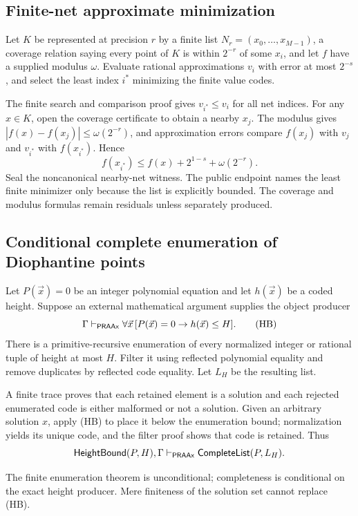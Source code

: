 \subsection{Finite-net approximate minimization}

Let \(K\) be represented at precision \(r\) by a finite list
\(N_r=(x_0,\ldots,x_{M-1})\), a coverage relation saying every point of \(K\)
is within \(2^{-r}\) of some \(x_i\), and let \(f\) have a supplied modulus
\(\omega\).  Evaluate rational approximations \(v_i\) with error at most
\(2^{-s}\), and select the least index \(i^*\) minimizing the finite value
codes.

The finite search and comparison proof gives
\(v_{i^*}\le v_i\) for all net indices.  For any \(x\in K\), open the coverage
certificate to obtain a nearby \(x_j\).  The modulus gives
\(|f(x)-f(x_j)|\le\omega(2^{-r})\), and approximation errors compare
\(f(x_j)\) with \(v_j\) and \(v_{i^*}\) with \(f(x_{i^*})\).  Hence
\[
  f(x_{i^*})\le f(x)+2^{1-s}+\omega(2^{-r}).
\]
Seal the noncanonical nearby-net witness.  The public endpoint names the least
finite minimizer only because the list is explicitly bounded.  The coverage
and modulus formulas remain residuals unless separately produced.

\subsection{Conditional complete enumeration of Diophantine points}

Let \(P(\vec x)=0\) be an integer polynomial equation and let \(h(\vec x)\) be
a coded height.  Suppose an external mathematical argument supplies the object
producer
\[
  \Gamma\mathrel{\vdash_{\mathsf{PRAAx}}}
  \forall\vec x\,[P(\vec x)=0\to h(\vec x)\le H].
  \tag{HB}
\]
There is a primitive-recursive enumeration of every normalized integer or
rational tuple of height at most \(H\).  Filter it using reflected polynomial
equality and remove duplicates by reflected code equality.  Let \(L_H\) be the
resulting list.

A finite trace proves that each retained element is a solution and each
rejected enumerated code is either malformed or not a solution.  Given an
arbitrary solution \(x\), apply (HB) to place it below the enumeration bound;
normalization yields its unique code, and the filter proof shows that code is
retained.  Thus
\[
  \mathsf{HeightBound}(P,H),\Gamma
    \mathrel{\vdash_{\mathsf{PRAAx}}} \mathsf{CompleteList}(P,L_H).
\]

The finite enumeration theorem is unconditional; completeness is conditional
on the exact height producer.  Mere finiteness of the solution set cannot
replace (HB).


